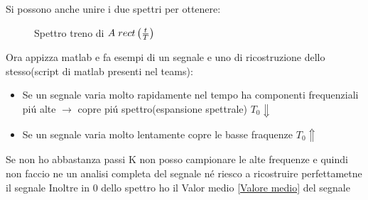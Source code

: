                Si possono anche unire i due spettri per ottenere: 
                \begin{figure}[H]
                    \centering
                    \caption{Spettro treno di $A\hspace{0.1cm}rect\left(\frac{t}{T}\right)$}
                    \label{fig:Spettro treno di rect}
                \end{figure}  
            Ora appizza matlab e fa esempi di un segnale e uno di ricostruzione dello stesso(script di matlab presenti nel teams):
            \begin{itemize}
                \item Se un segnale varia molto rapidamente nel tempo ha componenti frequenziali piú alte $\rightarrow$ copre piú spettro(espansione spettrale) $T_0 \Downarrow$
                \item Se un segnale varia molto lentamente copre le basse fraquenze $ T_0 \Uparrow$
            \end{itemize}
            Se non ho abbastanza passi K non posso campionare le alte frequenze e quindi non faccio ne un analisi completa del segnale né riesco a ricostruire perfettametne il segnale  
            Inoltre in $0$ dello spettro ho il Valor medio \ref{Valore medio} del segnale